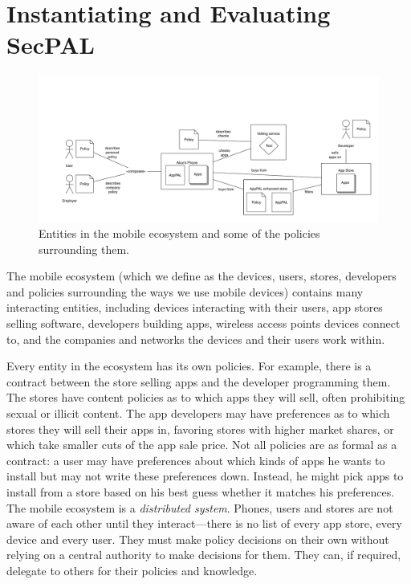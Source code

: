 \documentclass[thesis.tex]{subfiles}
\begin{document}
\chapter{Instantiating and Evaluating SecPAL}
\label{chap:apppal}

\begin{figure}
  \centering\noindent
  \includegraphics[width=\textwidth]{figures/policies-ecosystem.pdf}
  \medskip
  \caption[Entities in the mobile ecosystem]{Entities in the mobile ecosystem
    and some of the policies surrounding them.}
  \label{fig:ecosystem}
\end{figure}

The mobile ecosystem (which we define as the devices, users, stores, developers
and policies surrounding the ways we use mobile devices) contains many
interacting entities, including devices interacting with their users, app stores
selling software, developers building apps, wireless access points devices
connect to, and the companies and networks the devices and their users work
within.

Every entity in the ecosystem has its own policies. For example, there
is a contract between the store selling apps and the developer
programming them. The stores have content policies as to which apps
they will sell, often prohibiting sexual or illicit content. The app
developers may have preferences as to which stores they will sell
their apps in, favoring stores with higher market shares, or which
take smaller cuts of the app sale price. Not all policies are as
formal as a contract: a user may have preferences about which kinds of
apps he wants to install but may not write these preferences down.
Instead, he might pick apps to install from a store based on his best
guess whether it matches his preferences. The mobile ecosystem is a
\emph{distributed system}. Phones, users and stores are not aware of
each other until they interact---there is no list of every app store,
every device and every user.  They must make policy decisions on their
own without relying on a central authority to make decisions for
them. They can, if required, delegate to others for their policies and
knowledge.
\end{document}
